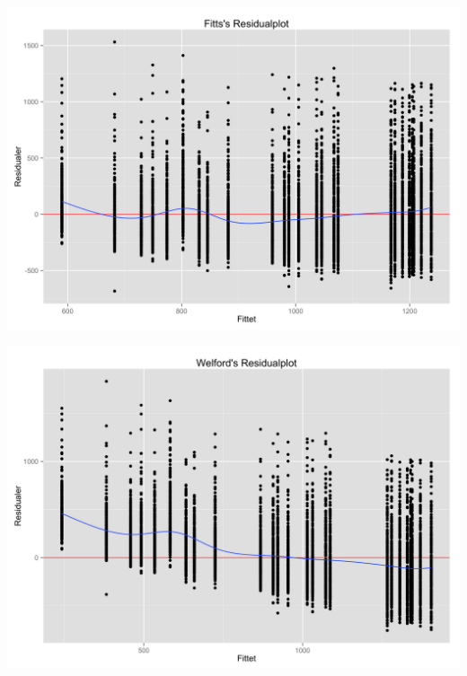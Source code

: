 \begin{minipage}{\linewidth}
	\begin{minipage}{.5\linewidth}
		\includegraphics[width=\linewidth]{images/plots/plot_residual_fitt}
		\label{fig:plot_residual_fitt}
	\end{minipage}
	\begin{minipage}{.5\linewidth}
		\includegraphics[width=\linewidth]{images/plots/plot_residual_welford}
		\label{fig:plot_residual_welford}
	\end{minipage}
	\begin{minipage}{.5\linewidth}

\end{minipage}
\end{minipage}
